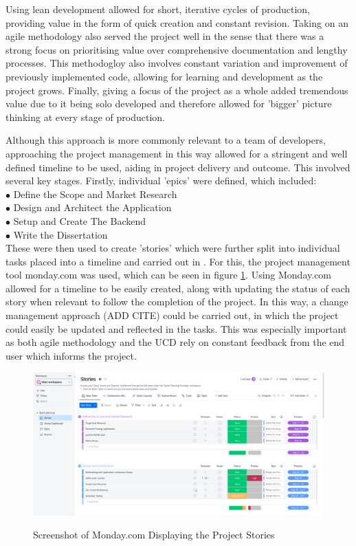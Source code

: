 \documentclass[12pt]{article}
\begin{document}
	Using lean development allowed for short, iterative cycles of production, providing value in the form of quick creation and constant revision. Taking on an agile methodology also served the project well in the sense that there was a strong focus on prioritising value over comprehensive documentation and lengthy processes. This methodogloy also involves constant variation and improvement of previously implemented code, allowing for learning and development as the project grows. Finally, giving a focus of the project as a whole added tremendous value due to it being solo developed and therefore allowed for 'bigger' picture thinking at every stage of production.
	

	Although this approach is more commonly relevant to a team of developers, approaching the project management in this way allowed for a stringent and well defined timeline to be used, aiding in project delivery and outcome. This involved several key stages.
	Firstly, individual 'epics' were defined, which included:
	\\
	$\bullet$ Define the Scope and Market Research
	\\
	$\bullet$ Design and Architect the Application
	\\
	$\bullet$ Setup and Create The Backend
	\\
	$\bullet$ Write the Dissertation
	\\
	
	These were then used to create 'stories' which were further split into individual tasks placed into a timeline and carried out in . For this, the project management tool monday.com \cite{MondayHome2021} was used, which can be seen in figure \ref{fig:monday.com}. Using Monday.com allowed for a timeline to be easily created, along with updating the status of each story when relevant to follow the completion of the project. In this way, a change management approach (ADD CITE) could be carried out, in which the project could easily be updated and reflected in the tasks. This was especially important as both agile methodology and the UCD rely on constant feedback from the end user which informs the project.
	
	\begin{figure}[H]
		\centering
		\includegraphics[scale=0.25]{images/monday.png}
		\caption{Screenshot of Monday.com Displaying the Project Stories}
		\label{fig:monday.com}
		\cite{MondayHome2021}
	\end{figure}
\end{document}
